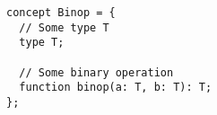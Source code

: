 \begin{lstlisting}[language=magnolia]
concept Binop = {
  // Some type T
  type T;

  // Some binary operation
  function binop(a: T, b: T): T;
};
\end{lstlisting}
